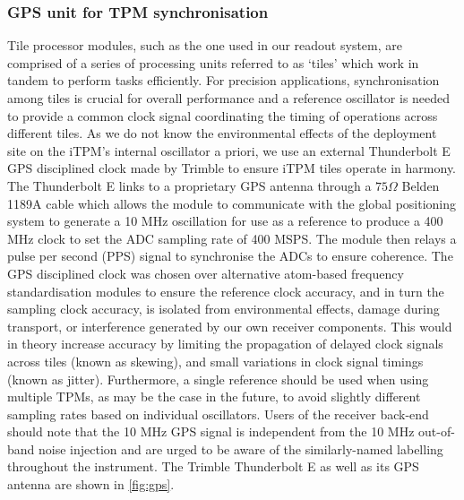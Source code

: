 \subsubsection{GPS unit for TPM synchronisation}
Tile processor modules, such as the one used in our readout system, are comprised of a series of processing units referred to as ‘tiles’ which work in tandem to perform tasks efficiently. For precision applications, synchronisation among tiles is crucial for overall performance and a reference oscillator is needed to provide a common clock signal coordinating the timing of operations across different tiles. As we do not know the environmental effects of the deployment site on the iTPM’s internal oscillator a priori, we use an external Thunderbolt E GPS disciplined clock made by Trimble to ensure iTPM tiles operate in harmony. The Thunderbolt E links to a proprietary GPS antenna through a $75 \Omega$ Belden 1189A cable which allows the module to communicate with the global positioning system to generate a 10 MHz oscillation for use as a reference to produce a 400 MHz clock to set the ADC sampling rate of 400 MSPS. The module then relays a pulse per second (PPS) signal to synchronise the ADCs to ensure coherence. The GPS disciplined clock was chosen over alternative atom-based frequency standardisation modules to ensure the reference clock accuracy, and in turn the sampling clock accuracy, is isolated from environmental effects, damage during transport, or interference generated by our own receiver components. This would in theory increase accuracy by limiting the propagation of delayed clock signals across tiles (known as skewing), and small variations in clock signal timings (known as jitter). Furthermore, a single reference should be used when using multiple TPMs, as may be the case in the future, to avoid slightly different sampling rates based on individual oscillators. Users of the receiver back-end should note that the 10 MHz GPS signal is independent from the 10 MHz out-of-band noise injection and are urged to be aware of the similarly-named labelling throughout the instrument. The Trimble Thunderbolt E as well as its GPS antenna are shown in \cref{fig:gps}.
